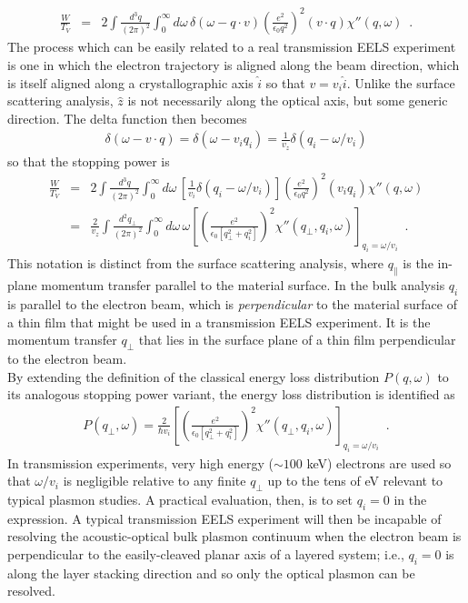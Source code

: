 \documentclass{article}
\newcommand{\lp}{\left(}
\newcommand{\lb}{\left[}
\newcommand{\rb}{\right]}
\newcommand{\rp}{\right)}
\newcommand{\e}{\epsilon}
\newcommand{\ba}{\begin{eqnarray}}
\newcommand{\ea}{\end{eqnarray}}
\begin{document}
\begin{appendix}
\ba
\frac{W}{T_V} &=&
2 \int\frac{d^3 q}{(2\pi)^2} \int_0^\infty d\omega\, \delta(\omega-q\cdot v)
\lp\frac{e^2}{\e_0 q^2}\rp^2
\lp v\cdot q\rp \chi''(q,\omega)\,\,\,.
\ea
The process which can be easily related to a real transmission EELS experiment is one in which the electron trajectory is aligned along the beam direction, which is itself aligned along a crystallographic axis $\hat i$ so that $v=v_i\hat i$.  Unlike the surface scattering analysis, $\hat z$ is not necessarily along the optical axis, but some generic direction.  The delta function then becomes
\ba
\delta(\omega-v\cdot q)=\delta(\omega-v_i q_i) = \frac{1}{v_z}\delta(q_i-\omega/v_i)
\ea
so that the stopping power is
\ba
\frac{W}{T_V} &=&
2 \int\frac{d^3 q}{(2\pi)^2} \int_0^\infty d\omega\, \lb \frac{1}{v_i}\delta(q_i-\omega/v_i)\rb
\lp\frac{e^2}{\e_0 q^2}\rp^2
\lp v_i q_i\rp \chi''(q,\omega)
\\ &=&
\frac{2}{v_z}\int\frac{d^2 q_\perp}{(2\pi)^2} \int_0^\infty d\omega\,\omega
\lb \lp\frac{e^2}{\e_0\lb q_\perp^2+q_i^2\rb}\rp^2 \chi''(q_\perp,q_i,\omega) \rb_{q_i=\omega/v_i}\,\,\,.
\ea
This notation is distinct from the surface scattering analysis, where $q_\parallel$ is the in-plane momentum transfer parallel to the material surface.  In the bulk analysis $q_i$ is parallel to the electron beam, which is {\it perpendicular} to the material surface of a thin film that might be used in  a transmission EELS experiment.  It is the momentum transfer $q_\perp$ that lies in the surface plane of a thin film perpendicular to the electron beam.  
\\

By extending the definition of the classical energy loss distribution $P(q,\omega)$ to its analogous stopping power variant, the energy loss distribution is identified as
\ba
P(q_\perp,\omega) = \frac{2}{\hbar v_i}\lb \lp\frac{e^2}{\e_0\lb q_\perp^2+q_i^2\rb}\rp^2 \chi''(q_\perp,q_i,\omega) \rb_{q_i=\omega/v_i}\,\,\,.
\ea
In transmission experiments, very high energy ($\sim 100$ keV) electrons are used so that $\omega/v_i$ is negligible relative to any finite $q_\perp$ up to the tens of eV relevant to typical plasmon studies.  A practical evaluation, then, is to set $q_i=0$ in the expression.  A typical transmission EELS experiment will then be incapable of resolving the acoustic-optical bulk plasmon continuum when the electron beam is perpendicular to the easily-cleaved planar axis of a layered system; i.e., $q_i=0$ is along the layer stacking direction and so only the optical plasmon can be resolved.



























\end{appendix}
\end{document}
